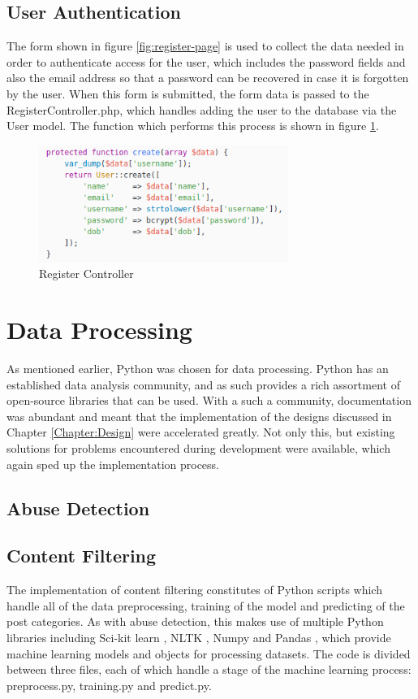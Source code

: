 \subsection{User Authentication}
The form shown in figure \ref{fig:register-page} is used to collect the data needed in order to authenticate access for the user, which includes the password fields and also the email address so that a password can be recovered in case it is forgotten by the user. When this form is submitted, the form data is passed to the RegisterController.php, which handles adding the user to the database via the User model. The function which performs this process is shown in figure \ref{fig:register-controller}.

\begin{figure}[H]
	\centering
	\includegraphics[height=1.5in]{Images/Implementation/register-controller}
	\caption{Register Controller} \label{fig:register-controller}
\end{figure}

\section{Data Processing}
As mentioned earlier, Python was chosen for data processing. Python has an established data analysis community, and as such provides a rich assortment of open-source libraries that can be used. With a such a community, documentation was abundant and meant that the implementation of the designs discussed in Chapter \ref{Chapter:Design} were accelerated greatly. Not only this, but existing solutions for problems encountered during development were available, which again sped up the implementation process. 

\subsection{Abuse Detection}
\subsection{Content Filtering}
The implementation of content filtering constitutes of Python scripts which handle all of the data preprocessing, training of the model and predicting of the post categories. As with abuse detection, this makes use of multiple Python libraries including Sci-kit learn \cite{scikit:home}, NLTK \cite{nltk}, Numpy \cite{Numpy} and Pandas \cite{Pandas}, which provide machine learning models and objects for processing datasets. The code is divided between three files, each of which handle a stage of the machine learning process: preprocess.py, training.py and predict.py.

